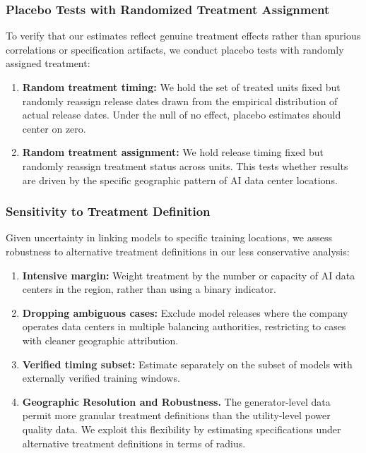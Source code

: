 \documentclass[sigconf,authordraft]{acmart}
\newcommand{\nb}[1]{\textcolor{blue}{NB[#1]}}
\begin{document}
\subsubsection{Placebo Tests with Randomized Treatment Assignment}

To verify that our estimates reflect genuine treatment effects rather than spurious correlations or specification artifacts, we conduct placebo tests with randomly assigned treatment:
\begin{enumerate}
    \item \textbf{Random treatment timing:} We hold the set of treated units fixed but randomly reassign release dates drawn from the empirical distribution of actual release dates. Under the null of no effect, placebo estimates should center on zero.
    \item \textbf{Random treatment assignment:} We hold release timing fixed but randomly reassign treatment status across units. This tests whether results are driven by the specific geographic pattern of AI data center locations.
\end{enumerate}

\subsubsection{Sensitivity to Treatment Definition}

Given uncertainty in linking models to specific training locations, we assess robustness to alternative treatment definitions in our less conservative analysis:
\begin{enumerate}
    \item \textbf{Intensive margin:} Weight treatment by the number or capacity of AI data centers in the region, rather than using a binary indicator.
    \item \textbf{Dropping ambiguous cases:} Exclude model releases where the company operates data centers in multiple balancing authorities, restricting to cases with cleaner geographic attribution.
    \item \textbf{Verified timing subset:} Estimate separately on the subset of models with externally verified training windows.
    \item \textbf{Geographic Resolution and Robustness.} The generator-level data permit more granular treatment definitions than the utility-level power quality data. We exploit this flexibility by estimating specifications under alternative treatment definitions in terms of radius.
\end{enumerate}
\end{document}
